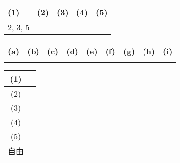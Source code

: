 

\begin{table}[htb]
    \begin{center} 
      \begin{tabular}{|p{}|p{}|p{}|p{}|p{}|} \hline
        (1) & (2) & (3) & (4) & (5)\\ \hline \hline
        2, 3, 5  &  & & &  \\ \hline		
      \end{tabular}
    \end{center}
  \end{table}

  \begin{table}[htb]
    \begin{center} 
      \begin{tabular}{|p{}|p{}|p{}|p{}|p{}|p{}|p{}|p{}|p{}|} \hline
        (a) & (b) & (c) & (d) & (e) & (f) & (g) & (h) & (i)\\ \hline
          &  & & & & & & &  \\ \hline		
      \end{tabular}
    \end{center}
  \end{table}

    \begin{table}[htb]
    \renewcommand\arraystretch{3.0}
    \begin{center} 
      \begin{tabular}{|c|p{}|} \hline
        (1) & \\ \hline
        (2)  & \\ \hline
        (3) & \\ \hline
        (4)  & \\ \hline
        (5) & \\ \hline
        自由  & \\ \hline
      \end{tabular}
    \end{center}
  \end{table}

